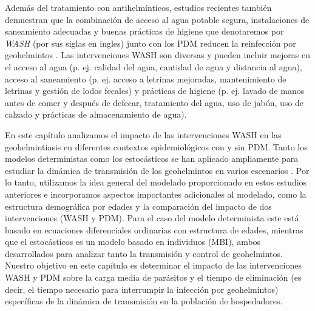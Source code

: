 \documentclass[12pt,a4paper]{article}
\theoremstyle{plain}%
\theoremstyle{definition}
\theoremstyle{remark}
\begin{document}
Además del tratamiento con antihelmínticos, estudios recientes también demuestran que la combinación de acceso al agua potable segura, instalaciones de saneamiento adecuadas y buenas prácticas de higiene 
que denotaremos por \textit{WASH} (por sus siglas en ingles) 
junto con los PDM reducen la reinfección por geohelmintos \cite{strunz2014water}.
Las intervenciones  WASH son diversas y pueden incluir mejoras en el acceso al agua (p. ej. calidad del agua, cantidad de agua y distancia al agua), acceso al saneamiento (p. ej. acceso a letrinas mejoradas, mantenimiento de letrinas y gestión de lodos fecales) y prácticas de higiene (p. ej. lavado de manos antes de comer y después de defecar, tratamiento del agua, uso de jabón, uso de calzado y prácticas de almacenamiento de agua). 





En este capítulo analizamos el impacto de las intervenciones WASH en las geohelmintiasis en diferentes contextos epidemiológicos con y sin PDM. 
Tanto los modelos deterministas como los estocásticos se han aplicado ampliamente para estudiar la dinámica de transmisión de los geohelmintos en varios escenarios \cite{anderson1985community,anderson1992infectious,anderson2014coverage,truscott2014modeling,truscott2016soil}. Por lo tanto, utilizamos la idea general del modelado proporcionado en estos estudios anteriores e %
incorporamos aspectos importantes adicionales al modelado, como la estructura demográfica por edades y la comparación del impacto de dos intervenciones (WASH y PDM).  
Para el caso del modelo determinista este está basado en ecuaciones diferenciales ordinarias con estructura de edades, mientras que  el estocásticos es un modelo basado en individuos (MBI), ambos desarrollados para analizar tanto la transmisión y control de geohelmintos.
Nuestro objetivo en este capítulo es 
determinar el impacto de las intervenciones  WASH y PDM sobre la carga media de parásitos y el tiempo de eliminación (es decir, el tiempo necesario para interrumpir la infección por geohelmintos) específicas de la dinámica de transmisión en la población de hospedadores.
\end{document}
